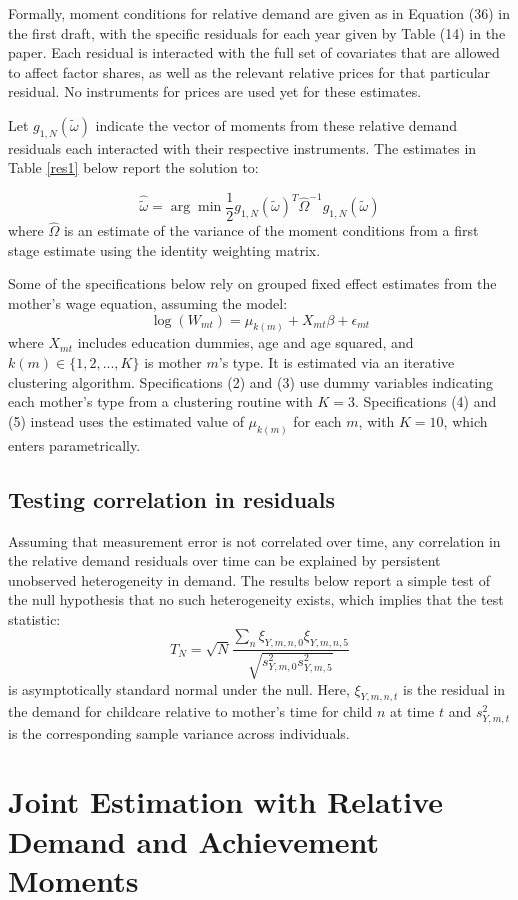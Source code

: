 \documentclass{article}
\begin{document}
Formally, moment conditions for relative demand are given as in Equation (36) in the first draft, with the specific residuals for each year given by Table (14) in the paper. Each residual is interacted with the full set of covariates that are allowed to affect factor shares, as well as the relevant relative prices for that particular residual. {\color{red}No instruments for prices are used yet for these estimates.}

Let $g_{1,N}(\tilde{\omega})$ indicate the vector of moments from these relative demand residuals each interacted with their respective instruments. The estimates in Table \ref{res1} below report the solution to:

\[ \hat{\tilde{\omega}} = \arg\min\frac{1}{2}g_{1,N}(\tilde{\omega})^{T}\hat{\Omega}^{-1}g_{1,N}(\tilde{\omega}) \]
where $\hat{\Omega}$ is an estimate of the variance of the moment conditions from a first stage estimate using the identity weighting matrix.

Some of the specifications below rely on grouped fixed effect estimates from the mother's wage equation, assuming the model:
\[ \log(W_{mt}) = \mu_{k(m)} + X_{mt}\beta + \epsilon_{mt} \]
where $X_{mt}$ includes education dummies, age and age squared, and $k(m)\in\{1,2,...,K\}$ is mother $m$'s type. It is estimated via an iterative clustering algorithm. Specifications (2) and (3) use dummy variables indicating each mother's type from a clustering routine with $K=3$. Specifications (4) and (5) instead uses the estimated value of $\mu_{k(m)}$ for each $m$, with $K=10$, which enters parametrically.

\subsection*{Testing correlation in residuals}
Assuming that measurement error is not correlated over time, any correlation in the relative demand residuals over time can be explained by persistent unobserved heterogeneity in demand. The results below report a simple test of the null hypothesis that no such heterogeneity exists, which implies that the test statistic:
\[ T_{N} = \sqrt{N}\frac{\sum_{n}\xi_{Y,m,n,0}\xi_{Y,m,n,5}}{\sqrt{s^2_{Y,m,0}s^2_{Y,m,5}}} \]
is asymptotically standard normal under the null. Here, $\xi_{Y,m,n,t}$ is the residual in the demand for childcare relative to mother's time for child $n$ at time $t$ and $s^2_{Y,m,t}$ is the corresponding sample variance across individuals.

\section*{Joint Estimation with Relative Demand and Achievement Moments}
\end{document}
